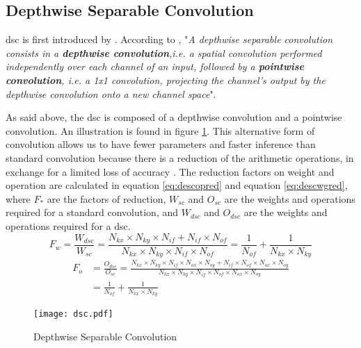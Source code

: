 \subsection{Depthwise Separable Convolution}  \label{subs:dsc}
\acrfull{dsc} is first introduced by \textcite{sifre_ecole_2014}. According to \textcite{chollet_xception_2017}, "\textit{A depthwise separable convolution consists in a \textbf{depthwise convolution},i.e. a spatial convolution performed independently over each channel of an input, followed by a \textbf{pointwise convolution}, i.e. a 1x1 convolution, projecting the channel's output by the
depthwise convolution onto a new channel space}".

As said above, the \acrshort{dsc} is composed of a depthwise convolution and a pointwise convolution. An illustration is found in figure \ref{fig:dsc}. This alternative form of convolution allows us to have fewer parameters and faster inference than standard convolution because there is a reduction of the arithmetic operations, in exchange for a limited loss of accuracy \cite{liu_fpga-based_2019}. The reduction factors on weight and operation are calculated in equation \eqref{eq:descopred} and equation \eqref{eq:descwgred}, where $F_{*}$ are the factors of reduction, $W_{sc}$ and $O_{sc}$ are the weights and operations required for a standard convolution, and $W_{dsc}$ and $O_{dsc}$ are the weights and operations required for a \acrshort{dsc}.
%
\begin{equation}
    F_w = \frac{W_{dsc}}{W_{sc}} =
    \frac{N_{kx} \times N_{ky} \times N_{if} + N_{if} \times N_{of}}{N_{kx} \times N_{ky} \times N_{if} \times N_{of}} =
    \frac{1}{N_{of}} + \frac{1}{N_{kx} \times N_{ky}}
    \label{eq:descopred}
\end{equation}
\begin{equation}
    \begin{split}
        F_o &= \frac{O_{dsc}}{O_{sc}} = \frac{N_{kx} \times N_{ky} \times N_{if} \times N_{ox} \times N_{oy} + N_{if} \times N_{of} \times N_{ox} \times N_{oy}}{N_{kx} \times N_{ky} \times N_{if} \times N_{of} \times N_{ox} \times N_{oy}} \\
        &= \frac{1}{N_{of}} + \frac{1}{N_{kx} \times N_{ky}}
    \end{split}
    \label{eq:descwgred}
\end{equation}
%
\begin{figure}
    \texttt{[image: dsc.pdf]}
    \caption{Depthwise Separable Convolution}
    \label{fig:dsc}
\end{figure}
